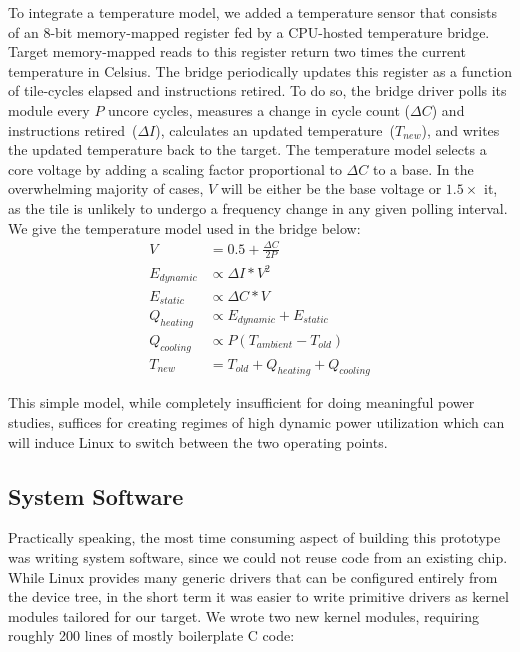 To integrate a temperature model, we added a temperature sensor that consists
of an 8-bit memory-mapped register fed by a CPU-hosted temperature bridge.
Target memory-mapped reads to this register return two times the current
temperature in Celsius. The bridge periodically updates this register as a
function of tile-cycles elapsed and instructions retired. To do so, the
bridge driver polls its module every $P$ uncore cycles, measures a change in
cycle count ($\Delta C$) and instructions retired~($\Delta I$), calculates an
updated temperature~($T_{new}$), and writes the updated temperature back to the target. The
temperature model selects a core voltage by adding a scaling factor proportional to $\Delta
C$ to a base. In the overwhelming majority of cases, $V$ will be either be the
base voltage or $1.5\times$ it, as the tile is unlikely to undergo a frequency
change in any given polling interval. We give the temperature model used in the bridge below:
\begin{equation}
\begin{split}
    V           & = 0.5 + \frac{\Delta C}{2P} \\
    E_{dynamic} & \propto \Delta I * V^2 \\
    E_{static}  & \propto \Delta C * V \\
    Q_{heating} & \propto E_{dynamic} + E_{static} \\
    Q_{cooling} & \propto P (T_{ambient} - T_{old}) \\
    T_{new}     & = T_{old} + Q_{heating} + Q_{cooling}
\end{split}
\end{equation}


This simple model, while completely insufficient for doing meaningful power
studies, suffices for creating regimes of high dynamic power utilization which
can will induce Linux to switch between the two operating points.

\subsection{System Software}
Practically speaking, the most time consuming aspect of building this prototype
was writing system software, since we could not reuse code from an
existing chip. While Linux provides many generic drivers that can be
configured entirely from the device tree, in the short term it was easier to write
primitive drivers as kernel modules tailored for our target. We wrote two new kernel modules,
requiring roughly 200 lines of mostly boilerplate C code:

